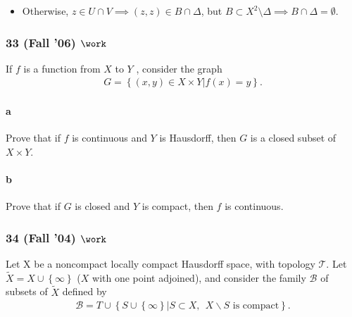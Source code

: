 \begin{solution}
\begin{itemize}
  \begin{itemize}
  \tightlist
  \item
    Otherwise, \(z\in U\cap V \implies (z, z) \in B\cap\Delta\), but
    \(B \subset X^2\setminus \Delta \implies B \cap\Delta = \emptyset\).
  \end{itemize}
\end{itemize}

\end{solution}

\hypertarget{fall-06-work}{%
\subsubsection{\texorpdfstring{33 (Fall '06)
\(\work\)}{33 (Fall '06) \textbackslash work}}\label{fall-06-work}}

If \(f\) is a function from \(X\) to \(Y\) , consider the graph
\begin{align*}
G = \left\{{(x, y) \in X \times Y \mathrel{\Big|}f (x) = y}\right\}
.\end{align*}

\hypertarget{a-9}{%
\paragraph{a}\label{a-9}}

Prove that if \(f\) is continuous and \(Y\) is Hausdorff, then \(G\) is
a closed subset of \(X \times Y\).

\hypertarget{b-9}{%
\paragraph{b}\label{b-9}}

Prove that if \(G\) is closed and \(Y\) is compact, then \(f\) is
continuous.

\hypertarget{fall-04-work}{%
\subsubsection{\texorpdfstring{34 (Fall '04)
\(\work\)}{34 (Fall '04) \textbackslash work}}\label{fall-04-work}}

Let X be a noncompact locally compact Hausdorff space, with topology
\({\mathcal{T}}\). Let \(\tilde X = X \cup \left\{{\infty}\right\}\)
(\(X\) with one point adjoined), and consider the family
\({\mathcal{B}}\) of subsets of \(\tilde X\) defined by
\begin{align*}
{\mathcal{B}}= T \cup \left\{{S \cup \left\{{\infty}\right\}\mathrel{\Big|}S \subset X,~~ X \backslash S \text{ is compact}}\right\}
.\end{align*}

